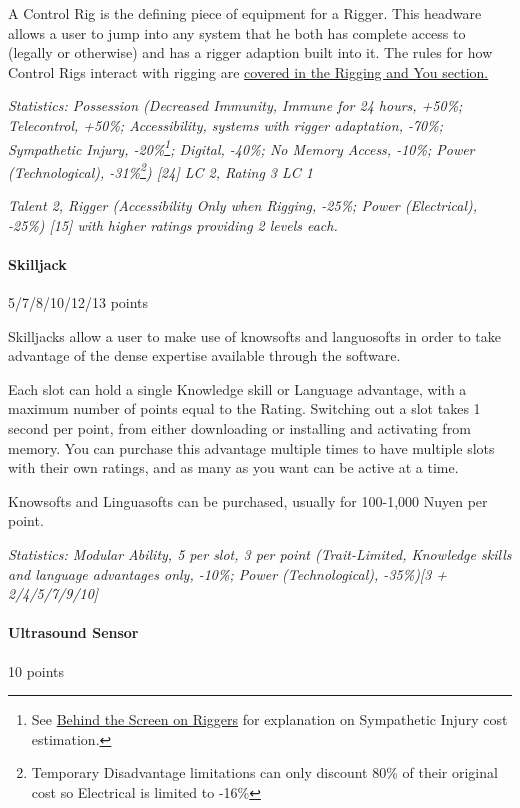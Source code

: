 \begin{multicols*}{3}
	A Control Rig is the defining piece of equipment for a Rigger. This headware allows a user to jump into any system that he both has complete access to (legally or otherwise) and has a rigger adaption built into it. The rules for how Control Rigs interact with rigging are \hyperref[riggers]{covered in the Rigging and You section.}
	
	\textit{\textcolor{OliveGreen}{Statistics: Possession (Decreased Immunity, Immune for 24 hours, +50\%; Telecontrol, +50\%; Accessibility, systems with rigger adaptation, -70\%; Sympathetic Injury, -20\%\footnote{See \hyperref[bts_riggers]{Behind the Screen on Riggers} for explanation on Sympathetic Injury cost estimation.}; Digital, -40\%; No Memory Access, -10\%; Power (Technological), -31\%\footnote{Temporary Disadvantage limitations can only discount 80\% of their original cost  so Electrical is limited to -16\%}) [24] LC 2, Rating 3 LC 1}}
	
	\textit{\textcolor{OliveGreen}{Talent 2, Rigger (Accessibility  Only when Rigging, -25\%; Power (Electrical), -25\%) [15] with higher ratings providing 2 levels each.}}
	
	\paragraph{Skilljack}
	\begin{flushright}
		5/7/8/10/12/13 points
	\end{flushright}
	
	Skilljacks allow a user to make use of knowsofts and languosofts in order to take advantage of the dense expertise available through the software. 
	
	Each slot can hold a single Knowledge skill or Language advantage, with a maximum number of points equal to the Rating. Switching out a slot takes 1 second per point, from either downloading or installing and activating from memory. You can purchase this advantage multiple times to have multiple slots with their own ratings, and as many as you want can be active at a time.
	
	Knowsofts and Linguasofts can be purchased, usually for 100-1,000 Nuyen per point.
	
	\textit{\textcolor{OliveGreen}{Statistics: Modular Ability, 5 per slot, 3 per point (Trait-Limited, Knowledge skills and language advantages only, -10\%; Power (Technological), -35\%)[3 + 2/4/5/7/9/10]}}
	
	\paragraph{Ultrasound Sensor}
	\begin{flushright}
		10 points
	\end{flushright}
	

\end{multicols*}
